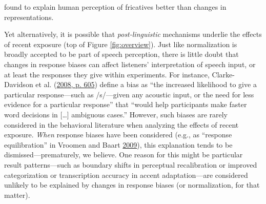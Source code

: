 \documentclass[
  11pt,
  english,
  man,floatsintext]{apa6}
\begin{document}
found to explain human perception of fricatives better than changes in representations.

Yet alternatively, it is possible that \emph{post-linguistic} mechanisms underlie the effects of recent exposure (top of Figure \ref{fig:overview}). Just like normalization is broadly accepted to be part of speech perception, there is little doubt that changes in response biases can affect listeners' interpretation of speech input, or at least the responses they give within experiments. For instance, Clarke-Davidson et al. (\protect\hyperlink{ref-clarkedavidson2008}{2008, p. 605}) define a bias as ``the increased likelihood to give a particular response---such as /s/---given any acoustic input, or the need for less evidence for a particular response'' that ``would help participants make faster word decisions in {[}\ldots{]} ambiguous cases.'' However, such biases are rarely considered in the behavioral literature when analyzing the effects of recent exposure. \emph{When} response biases have been considered (e.g., as {``response equilibration''} in Vroomen and Baart \protect\hyperlink{ref-vroomen-baart2009}{2009}), this explanation tends to be dismissed---prematurely, we believe. One reason for this might be particular result patterns---such as boundary shifts in perceptual recalibration or improved categorization or transcription accuracy in accent adaptation---are considered unlikely to be explained by changes in response biases (or normalization, for that matter).
\end{document}
